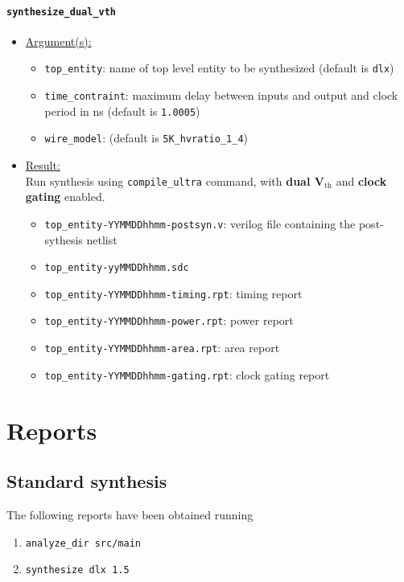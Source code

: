 \paragraph{\texttt{synthesize\_dual\_vth}}
\begin{itemize}
	\item \underline{Argument(s):}
		\begin{itemize}
			\item \texttt{top\_entity}: name of top level entity to
				be synthesized (default is \texttt{dlx})
			\item \texttt{time\_contraint}: maximum delay between
				inputs and output and clock period in ns
				(default is \texttt{1.0005})
			\item \texttt{wire\_model}: (default is \texttt{5K\_hvratio\_1\_4})
		\end{itemize}
	\item \underline{Result:} \\
		Run synthesis using \texttt{compile\_ultra} command, with
		\textbf{dual V$_{\text{th}}$} and \textbf{clock gating} enabled.
		\begin{itemize}
			\item \texttt{top\_entity-YYMMDDhhmm-postsyn.v}: verilog
				file containing the post-sythesis netlist
			\item \texttt{top\_entity-yyMMDDhhmm.sdc}
			\item \texttt{top\_entity-YYMMDDhhmm-timing.rpt}: timing
				report
			\item \texttt{top\_entity-YYMMDDhhmm-power.rpt}: power
				report
			\item \texttt{top\_entity-YYMMDDhhmm-area.rpt}: area
				report
			\item \texttt{top\_entity-YYMMDDhhmm-gating.rpt}: clock
				gating report
		\end{itemize}
\end{itemize}

\section{Reports}
\subsection{Standard synthesis}
\label{subsec:std_syn}
The following reports have been obtained running
\begin{enumerate}
	\item \texttt{analyze\_dir src/main}
	\item \texttt{synthesize dlx 1.5}
\end{enumerate}

